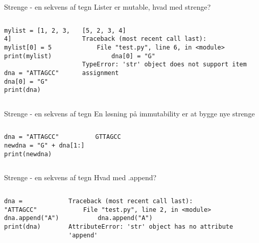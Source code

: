 \documentclass[main.tex]{subfiles}
\begin{document}
\begin{frame}[fragile]{Strenge - en sekvens af tegn}
	Lister er mutable, hvad med strenge?
	\begin{columns}
			\begin{lstlisting}[style=python]
mylist = [1, 2, 3, 4]
mylist[0] = 5
print(mylist)

dna = "ATTAGCC"
dna[0] = "G"
print(dna)
			\end{lstlisting}
		
		\pause
			\begin{lstlisting}[style=python]
[5, 2, 3, 4]
Traceback (most recent call last):
	File "test.py", line 6, in <module>
		dna[0] = "G"
TypeError: 'str' object does not support item assignment
			\end{lstlisting}
	\end{columns}
\end{frame}


\begin{frame}[fragile]{Strenge - en sekvens af tegn}
	En løsning på immutability er at bygge nye strenge
		\begin{columns}
		\column{0.4\textwidth}
		\begin{lstlisting}[style=python]
dna = "ATTAGCC"
newdna = "G" + dna[1:]
print(newdna)
		\end{lstlisting}
		
		\pause
		\column{0.4\textwidth}
		\begin{lstlisting}[style=python]
GTTAGCC
		\end{lstlisting}
	\end{columns}
\end{frame}

\begin{frame}[fragile]{Strenge - en sekvens af tegn}
	Hvad med .append?
	\begin{columns}
		\begin{lstlisting}[style=python]
dna = "ATTAGCC"
dna.append("A")
print(dna)
		\end{lstlisting}
		
		\pause
		\begin{lstlisting}[style=python]
Traceback (most recent call last):
	File "test.py", line 2, in <module>
		dna.append("A")
AttributeError: 'str' object has no attribute 'append'
		\end{lstlisting}
	\end{columns}
\end{frame}
\end{document}

